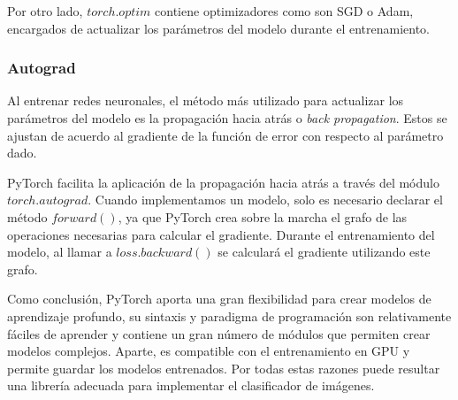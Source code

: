 Por otro lado, $torch.optim$ contiene optimizadores como son SGD o Adam, encargados de actualizar los parámetros del modelo durante el entrenamiento. \cite{pytorch-doc}

\subsubsection{Autograd}
Al entrenar redes neuronales, el método más utilizado para actualizar los parámetros del modelo es la propagación hacia atrás o \textit{back propagation}. Estos se ajustan de acuerdo al gradiente de la función de error con respecto al parámetro dado.

PyTorch facilita la aplicación de la propagación hacia atrás a través del módulo $torch.autograd$. Cuando implementamos un modelo, solo es necesario declarar el método $forward()$, ya que PyTorch crea sobre la marcha el grafo de las operaciones necesarias para calcular el gradiente. Durante el entrenamiento del modelo, al llamar a $loss.backward()$ se calculará el gradiente utilizando este grafo. \cite{pytorch-doc}

Como conclusión, PyTorch aporta una gran flexibilidad para crear modelos de aprendizaje profundo, su sintaxis y paradigma de programación son relativamente fáciles de aprender y contiene un gran número de módulos que permiten crear modelos complejos. Aparte, es compatible con el entrenamiento en GPU y permite guardar los modelos entrenados. Por todas estas razones puede resultar una librería adecuada para implementar el clasificador de imágenes.